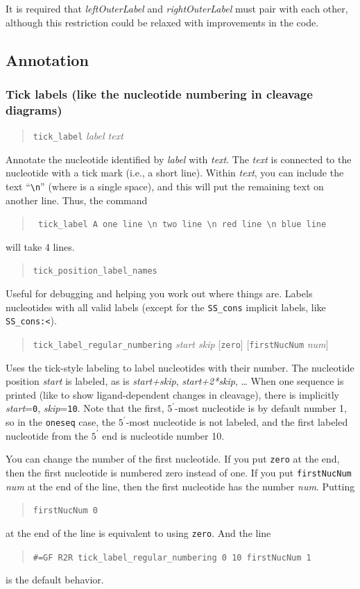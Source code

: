 \documentclass[letterpaper,12pt]{report}
\newcommand{\example}[1]{
\begin{quote}
{\raggedright
#1
}
\end{quote}
}
\newcommand{\examplett}[1]{
\example{{\tt #1}}
}
\begin{document}
It is required that \textit{leftOuterLabel }and \textit{rightOuterLabel
}must pair with each other, although this restriction could be relaxed
with improvements in the code.

\subsection{Annotation}
\subsubsection{Tick labels (like the nucleotide numbering in cleavage
diagrams)}
\label{sec:ticklabel}
\example{{\tt tick\_label} \textit{label text}}

Annotate the nucleotide identified by \textit{label} with \textit{text}.  The
\textit{text} is connected to the nucleotide with a tick mark (i.e., a short line).
Within {\it text}, you can include the text ``{\tt \textvisiblespace{}\textbackslash{}n\textvisiblespace{}}'' (where {\tt \textvisiblespace{}} is a single space), and this will put the remaining text on another line.
Thus, the command
\examplett{
tick\_label A one line \textbackslash{}n two line \textbackslash{}n red line \textbackslash{}n blue line
}
will take 4 lines.

\example{{\tt tick\_position\_label\_names}}

Useful for debugging and helping you work out where things are.  Labels
nucleotides with all valid labels (except for the {\tt SS\_cons} implicit
labels, like {\tt SS\_cons:{\textless}}).

\example{{\tt tick\_label\_regular\_numbering} \textit{start skip} [{\tt zero}] [{\tt firstNucNum} {\it num}]}

Uses the tick-style labeling to label nucleotides with their number. 
The nucleotide position \textit{start} is labeled, as is
\textit{start+skip}, \textit{start+2*skip}, {\dots}  When one sequence
is printed (like to show ligand-dependent changes in cleavage), there
is implicitly \textit{start}={\tt 0}, \textit{skip}={\tt 10}.  Note that the first,
$5^\prime$-most nucleotide is by default number 1, so in the {\tt oneseq} case, the
$5^\prime$-most nucleotide is not labeled, and the first labeled
nucleotide from the $5^\prime$ end is nucleotide number 10.  

You can change the number of the first nucleotide.  If you put {\tt zero} at the end, then the first nucleotide is numbered zero instead of one.  If you put {\tt firstNucNum} {\it num} at the end of the line, then the first nucleotide has the number {\it num}.  Putting \begin{quote}{\tt firstNucNum 0}\end{quote} at the end of the line is equivalent to using {\tt zero}.  And the line
\begin{quote}{\tt \#=GF R2R tick\_label\_regular\_numbering 0 10 firstNucNum 1}\end{quote}
is the default behavior.
\end{document}
